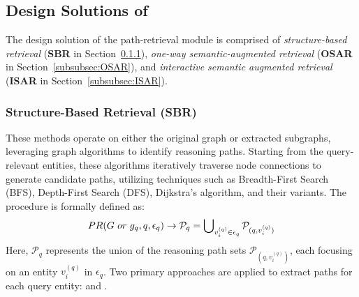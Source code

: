 {%


\subsection{Design Solutions of {\Retrieval}}
\label{subsection: design solutions of retrieval}

The design solution of the path-retrieval module is comprised of {\it structure-based retrieval} ({\bf SBR} in Section~\ref{subsubsec:SBR}), {\it one-way semantic-augmented retrieval} ({\bf OSAR} in Section~\ref{subsubsec:OSAR}), and {\it interactive semantic augmented retrieval} ({\bf ISAR} in Section~\ref{subsubsec:ISAR}).

\subsubsection{{\bf Structure-Based Retrieval ({\bf SBR})}} 
\label{subsubsec:SBR}
These methods operate on either the original graph or extracted subgraphs, leveraging graph algorithms to identify reasoning paths.
Starting from the query-relevant entities, these algorithms iteratively traverse node connections to generate candidate paths, utilizing techniques such as Breadth-First Search (BFS), Depth-First Search (DFS), Dijkstra's algorithm, and their variants. %
The procedure is formally defined as:
\begin{equation*}
\small
PR(G{~or~}g_q, q, \epsilon_q) \rightarrow \mathcal{P}_{q} = \bigcup\nolimits_{v_i^{(q)} \in \epsilon_q} \mathcal{P}_{(q,v_i^{(q)})}
\end{equation*}
Here, $\mathcal{P}_{q}$ represents the union of the reasoning path sets $\mathcal{P}_{(q,v_i^{(q)})}$, each focusing on an entity \( v_i^{(q)} \) in \( \epsilon_q \). 
Two primary approaches are applied to extract paths for each query entity: \textit{\getAllPaths} and \textit{\getShortestPaths}.


}
